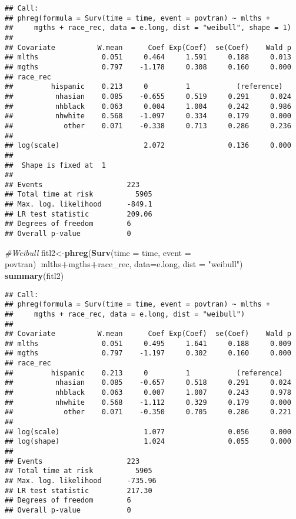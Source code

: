 \documentclass[
]{article}
\newenvironment{Shaded}{\begin{snugshade}}{\end{snugshade}}
\newcommand{\CommentTok}[1]{\textcolor[rgb]{0.56,0.35,0.01}{\textit{#1}}}
\newcommand{\DataTypeTok}[1]{\textcolor[rgb]{0.13,0.29,0.53}{#1}}
\newcommand{\KeywordTok}[1]{\textcolor[rgb]{0.13,0.29,0.53}{\textbf{#1}}}
\newcommand{\NormalTok}[1]{#1}
\newcommand{\OperatorTok}[1]{\textcolor[rgb]{0.81,0.36,0.00}{\textbf{#1}}}
\newcommand{\StringTok}[1]{\textcolor[rgb]{0.31,0.60,0.02}{#1}}
\begin{document}
\begin{verbatim}
## Call:
## phreg(formula = Surv(time = time, event = povtran) ~ mlths + 
##     mgths + race_rec, data = e.long, dist = "weibull", shape = 1)
## 
## Covariate          W.mean      Coef Exp(Coef)  se(Coef)    Wald p
## mlths               0.051     0.464     1.591     0.188     0.013 
## mgths               0.797    -1.178     0.308     0.160     0.000 
## race_rec 
##         hispanic    0.213     0         1           (reference)
##          nhasian    0.085    -0.655     0.519     0.291     0.024 
##          nhblack    0.063     0.004     1.004     0.242     0.986 
##          nhwhite    0.568    -1.097     0.334     0.179     0.000 
##            other    0.071    -0.338     0.713     0.286     0.236 
## 
## log(scale)                    2.072               0.136     0.000 
## 
##  Shape is fixed at  1 
## 
## Events                    223 
## Total time at risk          5905 
## Max. log. likelihood      -849.1 
## LR test statistic         209.06 
## Degrees of freedom        6 
## Overall p-value           0
\end{verbatim}

\begin{Shaded}
\begin{Highlighting}[]
\CommentTok{#Weibull}
\NormalTok{fitl2<-}\KeywordTok{phreg}\NormalTok{(}\KeywordTok{Surv}\NormalTok{(}\DataTypeTok{time =}\NormalTok{ time, }\DataTypeTok{event =}\NormalTok{ povtran)}\OperatorTok{~}\NormalTok{mlths}\OperatorTok{+}\NormalTok{mgths}\OperatorTok{+}\NormalTok{race_rec, }\DataTypeTok{data=}\NormalTok{e.long, }\DataTypeTok{dist =} \StringTok{"weibull"}\NormalTok{)}
\KeywordTok{summary}\NormalTok{(fitl2)  }
\end{Highlighting}
\end{Shaded}

\begin{verbatim}
## Call:
## phreg(formula = Surv(time = time, event = povtran) ~ mlths + 
##     mgths + race_rec, data = e.long, dist = "weibull")
## 
## Covariate          W.mean      Coef Exp(Coef)  se(Coef)    Wald p
## mlths               0.051     0.495     1.641     0.188     0.009 
## mgths               0.797    -1.197     0.302     0.160     0.000 
## race_rec 
##         hispanic    0.213     0         1           (reference)
##          nhasian    0.085    -0.657     0.518     0.291     0.024 
##          nhblack    0.063     0.007     1.007     0.243     0.978 
##          nhwhite    0.568    -1.112     0.329     0.179     0.000 
##            other    0.071    -0.350     0.705     0.286     0.221 
## 
## log(scale)                    1.077               0.056     0.000 
## log(shape)                    1.024               0.055     0.000 
## 
## Events                    223 
## Total time at risk          5905 
## Max. log. likelihood      -735.96 
## LR test statistic         217.30 
## Degrees of freedom        6 
## Overall p-value           0
\end{verbatim}
\end{document}
